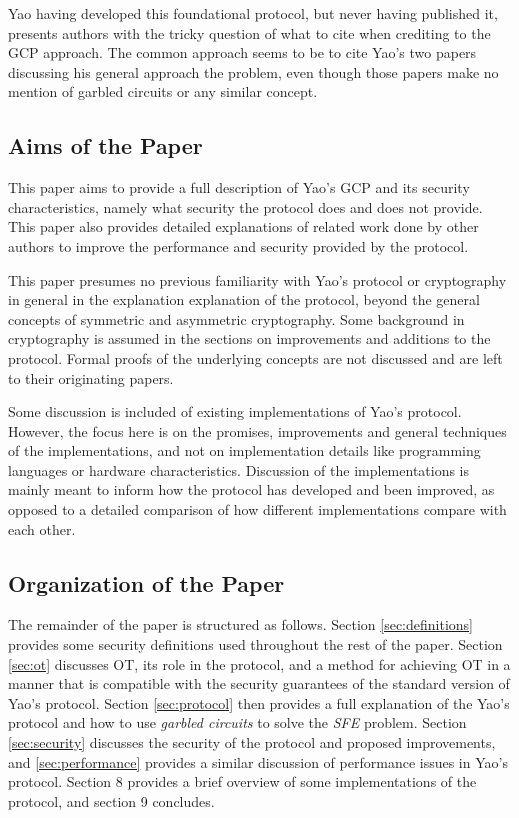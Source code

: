 Yao having developed this foundational protocol, but never having published it, presents authors with the tricky question of what to cite when crediting to the \ac{GCP} approach.  The common approach seems to be to cite Yao's two papers discussing his general approach the problem, even though those papers make no mention of garbled circuits or any similar concept.

\subsection{Aims of the Paper}

This paper aims to provide a full description of Yao's \ac{GCP} and its security characteristics, namely what security the protocol does and does not provide.  This paper also provides detailed explanations of related work done by other authors to improve the performance and security provided by the protocol.

This paper presumes no previous familiarity with Yao's protocol or cryptography in general in the explanation explanation of the protocol, beyond the general concepts of symmetric and asymmetric cryptography.  Some background in cryptography is assumed in the sections on improvements and additions to the protocol.  Formal proofs of the underlying concepts are not discussed and are left to their originating papers.

Some discussion is included of existing implementations of Yao's protocol. However, the focus here is on the promises, improvements and general techniques of the implementations, and not on implementation details like programming languages or hardware characteristics. Discussion of the implementations is mainly meant to inform how the protocol has developed and been improved, as opposed to a detailed comparison of how different implementations compare with each other.
\pagebreak
\subsection{Organization of the Paper}

The remainder of the paper is structured as follows. Section \ref{sec:definitions} provides some security definitions used throughout the rest of the paper. Section \ref{sec:ot} discusses \ac{OT}, its role in the protocol, and a method for achieving \ac{OT} in a manner that is compatible with the security guarantees of the standard version of Yao's protocol.  Section \ref{sec:protocol} then provides a full explanation of the Yao's protocol and how to use \emph{garbled circuits} to solve the \emph{SFE} problem. Section \ref{sec:security} discusses the security of the protocol and proposed improvements, and \ref{sec:performance} provides a similar discussion of performance issues in Yao's protocol. Section 8 provides a brief overview of some implementations of the protocol, and section 9 concludes.
